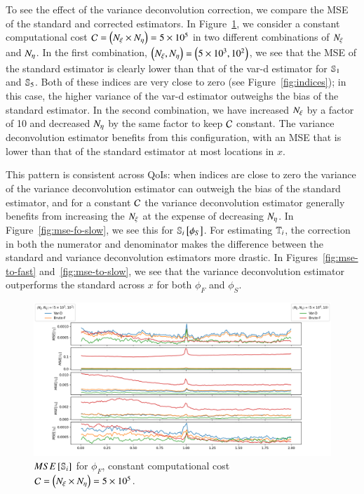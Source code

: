 To see the effect of the variance deconvolution correction, we compare the MSE of the standard and corrected estimators.
In Figure~\ref{fig:mse-fo-fast}, we consider a constant computational cost $\C = \left( \Nxi \times \Neta \right) = 5 \times 10^5$ in two different combinations of $\Nxi$ and $\Neta$.
In the first combination, $\left( \Nxi, \Neta \right) = \left( 5 \times 10^3, 10^2 \right)$, we see that the MSE of the standard estimator is clearly lower than that of the var-d estimator for $\S{1}$ and $\S{5}$. 
Both of these indices are very close to zero (see Figure~\ref{fig:indices}); in this case, the higher variance of the var-d estimator outweighs the bias of the standard estimator.
In the second combination, we have increased $\Nxi$ by a factor of 10 and decreased $\Neta$ by the same factor to keep $\C$ constant.
The variance deconvolution estimator benefits from this configuration, with an MSE that is lower than that of the standard estimator at most locations in $x$. 

This pattern is consistent across QoIs: when indices are close to zero the variance of the variance deconvolution estimator can outweigh the bias of the standard estimator, and for a constant $\C$ the variance deconvolution estimator generally benefits from increasing the $\Nxi$ at the expense of decreasing $\Neta$. 
In Figure~\ref{fig:mse-fo-slow}, we see this for $\S{i} \left[ \phi_S \right]$.
For estimating $\T{i}$, the correction in both the numerator and denominator makes the difference between the standard and variance deconvolution estimators more drastic.
In Figures~\ref{fig:mse-to-fast} and~\ref{fig:mse-to-slow}, we see that the variance deconvolution estimator outperforms the standard across $x$ for both $\phi_F$ and $\phi_S$.

\begin{figure}
    \centering
    \includegraphics[width=\textwidth]{figures/mse_firstorder_fast.png}
    \caption{$MSE\left[\S{i}\right]$ for $\phi_F$, constant computational cost $\C = \left( \Nxi \times \Neta \right) = 5 \times 10^5$.}
    \label{fig:mse-fo-fast}
\end{figure}

